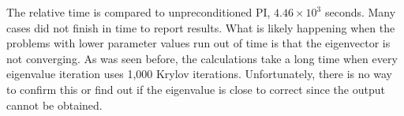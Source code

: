 \documentclass[preprint,12pt]{elsarticle}
\begin{document}
% 
% 
%
The relative time is compared to unpreconditioned PI, $4.46 \times 10^{3}$ seconds. Many cases did not finish in time to report results. What is likely happening when the problems with lower parameter values run out of time is that the eigenvector is not converging. As was seen before, the calculations take a long time when every eigenvalue iteration uses 1,000 Krylov iterations. Unfortunately, there is no way to confirm this or find out if the eigenvalue is close to correct since the output cannot be obtained. 
%
\end{document}
